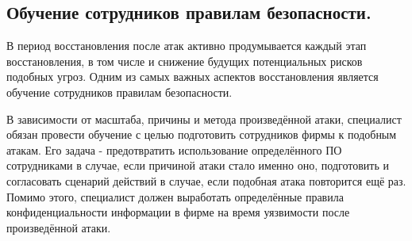 \newpage
\subsection{Обучение сотрудников правилам безопасности.}

    В период восстановления после атак активно продумывается каждый этап восстановления, в том числе и снижение будущих
    потенциальных рисков подобных угроз. Одним из самых важных аспектов восстановления является обучение сотрудников правилам безопасности.
    
    В зависимости от масштаба, причины и метода произведённой атаки, специалист обязан провести обучение с целью подготовить сотрудников фирмы 
    к подобным атакам. Его задача - предотвратить использование определённого ПО сотрудниками в случае, если причиной атаки стало именно оно,
    подготовить и согласовать сценарий действий в случае, если подобная атака повторится ещё раз. Помимо этого, специалист должен выработать
    определённые правила конфиденциальности информации в фирме на время уязвимости после произведённой атаки.




